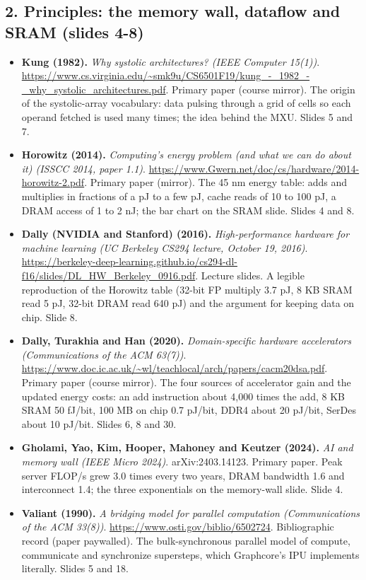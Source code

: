 \subsection*{2. Principles: the memory wall, dataflow and SRAM (slides 4-8)}
\begin{itemize}[leftmargin=1.2em,itemsep=3pt]\sloppy
\item \textbf{Kung (1982).} \textit{Why systolic architectures? (IEEE Computer 15(1))}. \url{https://www.cs.virginia.edu/~smk9u/CS6501F19/kung_-_1982_-_why_systolic_architectures.pdf}. Primary paper (course mirror). The origin of the systolic-array vocabulary: data pulsing through a grid of cells so each operand fetched is used many times; the idea behind the MXU. Slides 5 and 7.
\item \textbf{Horowitz (2014).} \textit{Computing's energy problem (and what we can do about it) (ISSCC 2014, paper 1.1)}. \url{https://www.Gwern.net/doc/cs/hardware/2014-horowitz-2.pdf}. Primary paper (mirror). The 45 nm energy table: adds and multiplies in fractions of a pJ to a few pJ, cache reads of 10 to 100 pJ, a DRAM access of 1 to 2 nJ; the bar chart on the SRAM slide. Slides 4 and 8.
\item \textbf{Dally (NVIDIA and Stanford) (2016).} \textit{High-performance hardware for machine learning (UC Berkeley CS294 lecture, October 19, 2016)}. \url{https://berkeley-deep-learning.github.io/cs294-dl-f16/slides/DL_HW_Berkeley_0916.pdf}. Lecture slides. A legible reproduction of the Horowitz table (32-bit FP multiply 3.7 pJ, 8 KB SRAM read 5 pJ, 32-bit DRAM read 640 pJ) and the argument for keeping data on chip. Slide 8.
\item \textbf{Dally, Turakhia and Han (2020).} \textit{Domain-specific hardware accelerators (Communications of the ACM 63(7))}. \url{https://www.doc.ic.ac.uk/~wl/teachlocal/arch/papers/cacm20dsa.pdf}. Primary paper (course mirror). The four sources of accelerator gain and the updated energy costs: an add instruction about 4,000 times the add, 8 KB SRAM 50 fJ/bit, 100 MB on chip 0.7 pJ/bit, DDR4 about 20 pJ/bit, SerDes about 10 pJ/bit. Slides 6, 8 and 30.
\item \textbf{Gholami, Yao, Kim, Hooper, Mahoney and Keutzer (2024).} \textit{AI and memory wall (IEEE Micro 2024)}. arXiv:2403.14123. Primary paper. Peak server FLOP/s grew 3.0 times every two years, DRAM bandwidth 1.6 and interconnect 1.4; the three exponentials on the memory-wall slide. Slide 4.
\item \textbf{Valiant (1990).} \textit{A bridging model for parallel computation (Communications of the ACM 33(8))}. \url{https://www.osti.gov/biblio/6502724}. Bibliographic record (paper paywalled). The bulk-synchronous parallel model of compute, communicate and synchronize supersteps, which Graphcore's IPU implements literally. Slides 5 and 18.

\end{itemize}
